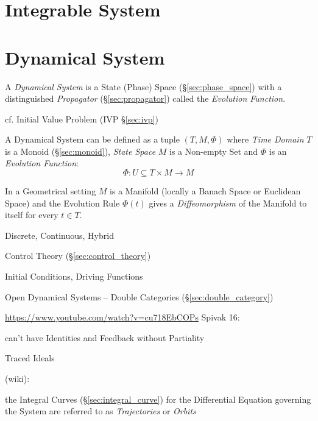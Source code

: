 


\section{Integrable System}\label{sec:integrable_system}



\section{Dynamical System}\label{sec:dynamical_system}

A \emph{Dynamical System} is a State (Phase) Space (\S\ref{sec:phase_space})
with a distinguished \emph{Propagator} (\S\ref{sec:propagator}) called the
\emph{Evolution Function}.

\fist cf. Initial Value Problem (IVP \S\ref{sec:ivp})

A Dynamical System can be defined as a tuple $(T,M,\Phi)$ where \emph{Time
  Domain} $T$ is a Monoid (\S\ref{sec:monoid}), \emph{State Space} $M$ is a
Non-empty Set and $\Phi$ is an \emph{Evolution Function}:
\[
  \Phi : U \subseteq T \times M \rightarrow M
\]

In a Geometrical setting $M$ is a Manifold (locally a Banach Space or Euclidean
Space) and the Evolution Rule $\Phi(t)$ gives a \emph{Diffeomorphism} of the
Manifold to itself for every $t \in T$. %

Discrete, Continuous, Hybrid

Control Theory (\S\ref{sec:control_theory})

Initial Conditions, Driving Functions


Open Dynamical Systems -- Double Categories (\S\ref{sec:double_category})

\url{https://www.youtube.com/watch?v=cu718EbCOPs} Spivak 16:

can't have Identities and Feedback without Partiality %

Traced Ideals %

(wiki):

the Integral Curves (\S\ref{sec:integral_curve}) for the Differential Equation
governing the System are referred to as \emph{Trajectories} or \emph{Orbits}

